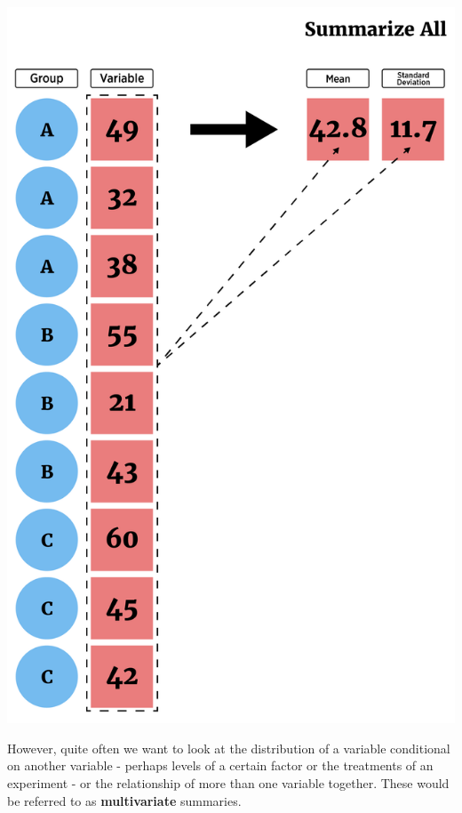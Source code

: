\documentclass[
]{book}
\theoremstyle{definition}
\theoremstyle{definition}
\theoremstyle{definition}
\theoremstyle{remark}
\begin{document}
\begin{center}\includegraphics[width=0.8\linewidth]{img/summarizeAllF} \end{center}

However, quite often we want to look at the distribution of a variable conditional on another variable - perhaps levels of a certain factor or the treatments of an experiment - or the relationship of more than one variable together. These would be referred to as \textbf{multivariate} summaries.
\end{document}
